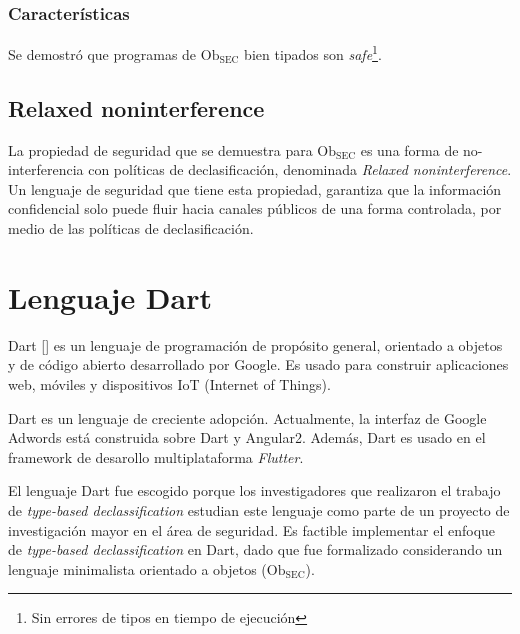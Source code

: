 	\subsubsection{Características}

	Se demostró que programas de $\text{Ob}_{\text{SEC}}$ bien tipados son \textit{safe}\footnote{Sin errores de tipos en tiempo de ejecución}.

	\subsection{Relaxed noninterference}

	La propiedad de seguridad que se demuestra para $\text{Ob}_{\text{SEC}}$ es una forma de no-interferencia con políticas de declasificación, denominada \textit{Relaxed noninterference}.	Un lenguaje de seguridad que tiene esta propiedad, garantiza que la información confidencial solo puede fluir hacia canales públicos de una forma controlada, por medio de las políticas de declasificación. %

	\section{Lenguaje Dart}

	Dart [] es un lenguaje de programación de propósito general, orientado a objetos y de código abierto desarrollado por Google. Es usado para construir aplicaciones web, móviles y dispositivos IoT (Internet of Things). %

	Dart es un lenguaje de creciente adopción. Actualmente, la interfaz de Google Adwords está construida sobre Dart y Angular2. Además, Dart es usado en el framework de desarollo multiplataforma \textit{Flutter}.

	El lenguaje Dart fue escogido porque los investigadores que realizaron el trabajo de \textit{type-based declassification} estudian este lenguaje como parte de un proyecto de investigación mayor en el área de seguridad. Es factible implementar el enfoque de \textit{type-based declassification} en Dart, dado que fue formalizado considerando un lenguaje minimalista orientado a objetos ($\text{Ob}_{\text{SEC}}$).
